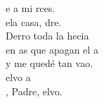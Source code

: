 \begin{cancion}[Vuelvo][Ixcís]%
	e a mi rces. \\
	ela casa, dre.\\
	Derro toda la hecia \\
	en as que apagan el a\\
	y me quedé tan vao. \\
	elvo a \\
	, Padre, elvo.\\
\end{cancion}%
